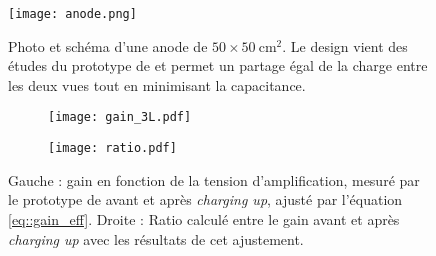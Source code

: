       \begin{figure}[!htb]
        \centering
        \texttt{[image: anode.png]}
        \caption[Photo et schéma d'une anode]{Photo et schéma d'une anode de $50\times\SI{50}{\centi\meter\squared}$. Le design vient des études du prototype de \threeL{}\cite{Wu2017,Cantini2013} et permet un partage égal de la charge entre les deux vues tout en minimisant la capacitance.}
        \label{fig::anode}
      \end{figure}

      \begin{figure}[!htb]
        \begin{subfigure}[t]{0.48\textwidth}
          \flushleft
          \centering
          \texttt{[image: gain\_3L.pdf]}
        \end{subfigure}\hfill
        \begin{subfigure}[t]{0.48\textwidth}
          \flushleft
          \centering
          \texttt{[image: ratio.pdf]}
        \end{subfigure}
        \caption[Gain en fonction du potentiel mesuré par le prototype de \threeL{}]{
        \label{fig::3L_gain}Gauche : gain en fonction de la tension d'amplification, mesuré par le prototype de \threeL{} avant et après \textit{charging up}, ajusté par l'équation \eqref{eq::gain_eff}. Droite : Ratio calculé entre le gain avant et après \textit{charging up} avec les résultats de cet ajustement.}
      \end{figure}

